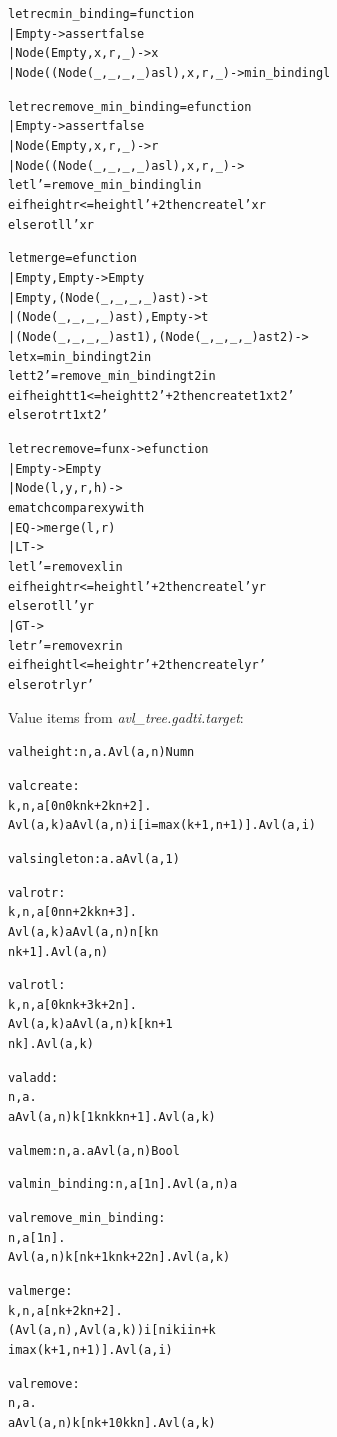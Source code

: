 \documentclass{article}
\newcommand{\tmem}[1]{{\em #1\/}}
\newenvironment{tmcode}[1][]{\begin{alltt}}{\end{alltt}}
\begin{document}
\begin{tmcode}
let rec min_binding = function
  | Empty -> assert false
  | Node (Empty, x, r, _) -> x
  | Node ((Node (_,_,_,_) as l), x, r, _) -> min_binding l

let rec remove_min_binding = efunction
  | Empty -> assert false
  | Node (Empty, x, r, _) -> r
  | Node ((Node (_,_,_,_) as l), x, r, _) ->
    let l' = remove_min_binding l in
    eif height r <= height l' + 2 then create l' x r
    else rotl l' x r

let merge = efunction
  | Empty, Empty -> Empty
  | Empty, (Node (_,_,_,_) as t) -> t
  | (Node (_,_,_,_) as t), Empty -> t
  | (Node (_,_,_,_) as t1), (Node (_,_,_,_) as t2) ->
    let x = min_binding t2 in
    let t2' = remove_min_binding t2 in
    eif height t1 <= height t2' + 2 then create t1 x t2'
    else rotr t1 x t2'

let rec remove = fun x -> efunction
  | Empty -> Empty
  | Node (l, y, r, h) ->
    ematch compare x y with
    | EQ -> merge (l, r)
    | LT ->
      let l' = remove x l in
      eif height r <= height l' + 2 then create l' y r
      else rotl l' y r
    | GT ->
      let r' = remove x r in
      eif height l <= height r' + 2 then create l y r'
      else rotr l y r'
\end{tmcode}
Value items from {\tmem{avl\_tree.gadti.target}}:
\begin{tmcode}
val height : n, a. Avl (a, n)  Num n

val create :
   k, n, a[0  n  0  k  n  k + 2  k  n + 2].
   Avl (a, k)  a  Avl (a, n)  i[i=max (k + 1, n + 1)].Avl (a, i)

val singleton : a. a  Avl (a, 1)

val rotr :
   k, n, a[0  n  n + 2  k  k  n + 3].
   Avl (a, k)  a  Avl (a, n)  n[k  n 
     n  k + 1].Avl (a, n)

val rotl :
   k, n, a[0  k  n  k + 3  k + 2  n].
   Avl (a, k)  a  Avl (a, n)  k[k  n + 1 
     n  k].Avl (a, k)

val add :
   n, a.
   a  Avl (a, n)  k[1  k  n  k  k  n + 1].Avl (a, k)

val mem : n, a. a  Avl (a, n)  Bool

val min_binding : n, a[1  n]. Avl (a, n)  a

val remove_min_binding :
   n, a[1  n].
   Avl (a, n)  k[n  k + 1  k  n  k + 2  2 n].Avl (a, k)

val merge :
   k, n, a[n  k + 2  k  n + 2].
   (Avl (a, n), Avl (a, k))  i[n  i  k  i  i  n + k 
     imax (k + 1, n + 1)].Avl (a, i)

val remove :
   n, a.
   a  Avl (a, n)  k[n  k + 1  0  k  k  n].Avl (a, k)
\end{tmcode}
\end{document}
